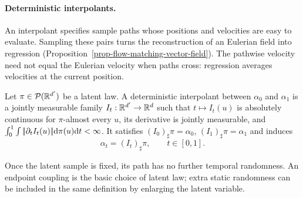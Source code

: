 \paragraph{Deterministic interpolants.}

An interpolant specifies sample paths whose positions and velocities are easy to evaluate. Sampling these pairs turns the reconstruction of an Eulerian field into regression (Proposition~\ref{prop-flow-matching-vector-field}). The pathwise velocity need not equal the Eulerian velocity when paths cross: regression averages velocities at the current position.
\begin{defn}\label{def-deterministic-interpolant}
Let $\pi\in\mathcal{P}(\mathbb{R}^{d'})$ be a latent law. A deterministic interpolant between $\alpha_0$ and $\alpha_1$ is a jointly measurable family $I_t:\mathbb{R}^{d'}\to\mathbb{R}^d$ such that $t\mapsto I_t(u)$ is absolutely continuous for $\pi$-almost every $u$, its derivative is jointly measurable, and $\int_0^1\int|\!| \partial_tI_t(u) |\!|\mathrm{d}\pi(u)\mathrm{d} t<\infty$. It satisfies $(I_0)_\sharp\pi=\alpha_0$, $(I_1)_\sharp\pi=\alpha_1$ and induces
\begin{equation}\label{eq:interp-coupling}
 \alpha_t=(I_t)_\sharp\pi,\qquad t\in[0,1].
\end{equation}
\end{defn}
Once the latent sample is fixed, its path has no further temporal randomness. An endpoint coupling is the basic choice of latent law; extra static randomness can be included in the same definition by enlarging the latent variable.

